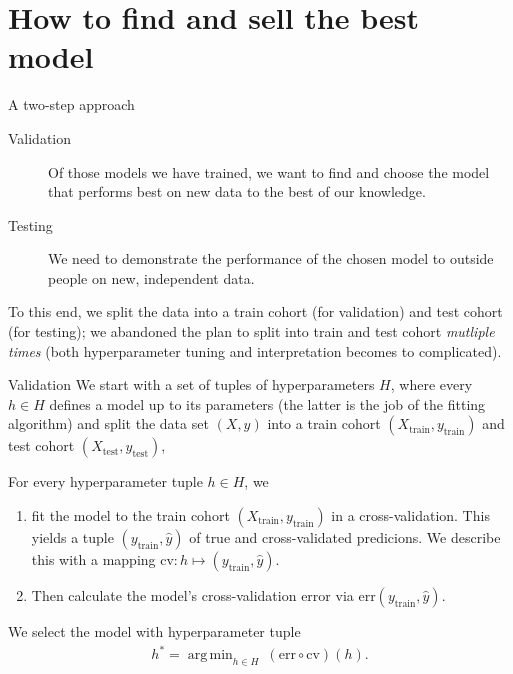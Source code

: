 \documentclass[10pt, aspectratio=169]{beamer}
\DeclareMathOperator*{\argmin}{arg\,min}
\begin{document}
\section{How to find and sell the best model}

\begin{frame}{A two-step approach}
  \begin{description}
    \item[Validation] Of those models we have trained, we want to find and choose
       the model that performs best on new data to the best of \alert{our} knowledge.
    \item[Testing] We need to demonstrate the performance of the chosen model to 
      \alert{outside} people on new, independent data.
  \end{description}

  \pause
  To this end, we split the data into a train cohort (for validation) and test 
  cohort (for testing); we abandoned the plan to split into train and test cohort 
  \textit{mutliple times} (both hyperparameter tuning and interpretation becomes 
  to complicated).
\end{frame}

\begin{frame}{Validation}
  We start with a set of tuples of hyperparameters $H$, where every $h \in H$ 
  defines a model up to its parameters (the latter is the job of the fitting 
  algorithm) and split the data set $(X, y)$ into a train 
  cohort $(X_{\text{train}}, y_{\text{train}})$ and test cohort 
  $(X_{\text{test}}, y_{\text{test}})$,

  For every hyperparameter tuple $h \in H$, we
  \pause

  \begin{enumerate}
    \item fit the model to the train cohort $(X_{\text{train}}, y_{\text{train}})$
    in a cross-validation. This yields a tuple $(y_{\text{train}}, \hat{y})$
    of true and cross-validated predicions. We describe this with a mapping 
    $\text{cv}: h \mapsto (y_{\text{train}}, \hat{y})$.
    \pause
    \item Then calculate the model's cross-validation error via $\text{err}(
      y_{\text{train}}, \hat{y})$.
  \end{enumerate}

  We select the model with hyperparameter tuple
  \begin{align*}
    h^* = \argmin_{h \in H} \ (\text{err} \circ \text{cv})(h).
  \end{align*}
\end{frame}
\end{document}
